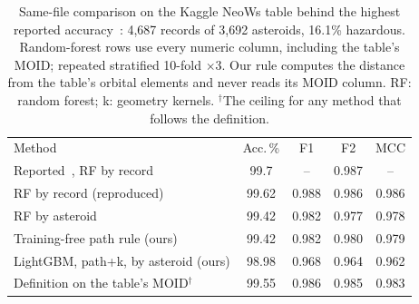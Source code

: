 \begin{table}[t]
\centering
\footnotesize
\caption{Same-file comparison on the Kaggle NeoWs table behind the highest reported accuracy~\cite{kaggle_nasa,chandra2025}: 4,687 records of 3,692 asteroids, 16.1\% hazardous. Random-forest rows use every numeric column, including the table's MOID; repeated stratified 10-fold $\times$3. Our rule computes the distance from the table's orbital elements and never reads its MOID column. RF: random forest; k: geometry kernels. $^\dagger$The ceiling for any method that follows the definition.}
\label{tab:kaggle}
\setlength{\tabcolsep}{2.2pt}
\begin{tabular}{@{}lcccc@{}}
\toprule
Method & Acc.\,\% & F1 & F2 & MCC \\
Reported~\cite{chandra2025}, RF by record & 99.7 & -- & 0.987 & -- \\
\midrule
RF by record (reproduced) & 99.62 & 0.988 & 0.986 & 0.986 \\
RF by asteroid & 99.42 & 0.982 & 0.977 & 0.978 \\
Training-free path rule (ours) & 99.42 & 0.982 & 0.980 & 0.979 \\
LightGBM, path+k, by asteroid (ours) & 98.98 & 0.968 & 0.964 & 0.962 \\
\midrule
Definition on the table's MOID$^\dagger$ & 99.55 & 0.986 & 0.985 & 0.983 \\
\bottomrule
\end{tabular}
\end{table}
